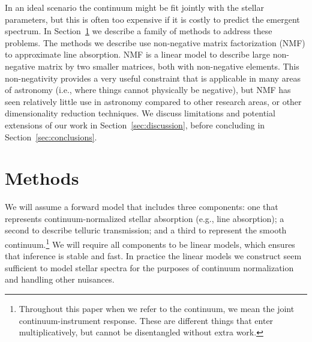 \documentclass[modern]{aastex631}
\begin{document}
In an ideal scenario the continuum might be fit jointly with the stellar parameters, but this is often too expensive if it is costly to predict the emergent spectrum. In Section~\ref{sec:methods} we describe a family of methods to address these problems.
The methods we describe use non-negative matrix factorization (NMF) to approximate line absorption. NMF is a linear model to describe large non-negative matrix by two smaller matrices, both with non-negative elements. This non-negativity provides a very useful constraint that is applicable in many areas of astronomy (i.e., where things cannot physically be negative), but NMF has seen relatively little use in astronomy compared to other research areas, or other dimensionality reduction techniques.
We discuss limitations and potential extensions of our work in Section~\ref{sec:discussion}, before concluding in Section~\ref{sec:conclusions}.\\



\section{Methods}\label{sec:methods}

We will assume a forward model that includes three components: one that represents continuum-normalized stellar absorption (e.g., line absorption); a second to describe telluric transmission; and a third to represent the smooth continuum.\footnote{Throughout this paper when we refer to the continuum, we mean the joint continuum-instrument response. These are different things that enter multiplicatively, but cannot be disentangled without extra work.} We will require all components to be linear models, which ensures that inference is stable and fast. In practice the linear models we construct seem sufficient to model stellar spectra for the purposes of continuum normalization and handling other nuisances.\\

\end{document}
